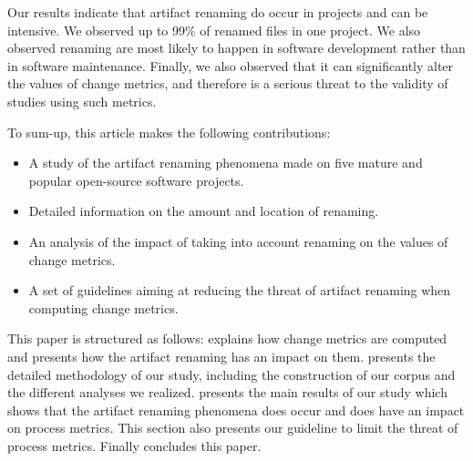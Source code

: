 Our results indicate that artifact renaming do occur in projects and can be intensive. We observed up to 99\% of renamed files in one project. We also observed renaming are most likely to happen in software development rather than in software maintenance. Finally, we also observed that it can significantly alter the values of change metrics, and therefore is a serious threat to the validity of studies using such metrics.

To sum-up, this article makes the following contributions:
\begin{itemize}
	\item A study of the artifact renaming phenomena made on five mature and popular open-source software projects.
	\item Detailed information on the amount and location of renaming.
	\item An analysis of the impact of taking into account renaming on the values of change metrics.
	\item A set of guidelines aiming at reducing the threat of artifact renaming when computing change metrics.
\end{itemize}

This paper is structured as follows:  explains how change metrics are computed and presents how the artifact renaming has an impact on them.  presents the detailed methodology of our study, including the construction of our corpus and the different analyses we realized.  presents the main results of our study which shows that the artifact renaming phenomena does occur and does have an impact on process metrics. This section also presents our guideline to limit the threat of process metrics. Finally  concludes this paper.





